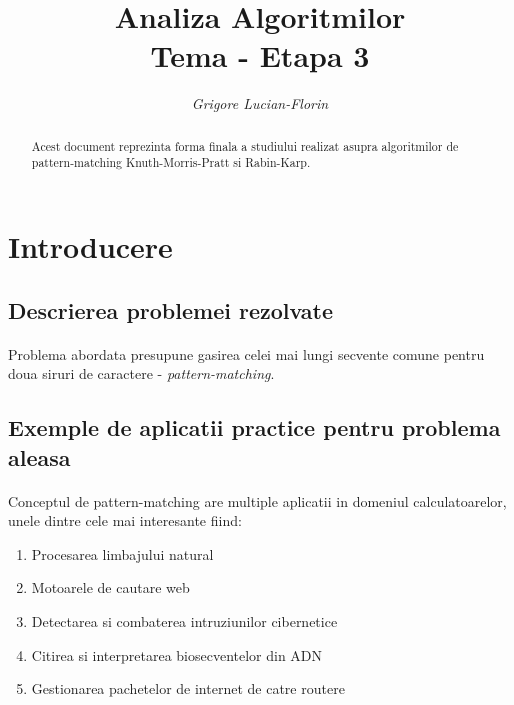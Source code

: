 \documentclass[runningheads]{llncs}
\begin{document}
\title{\huge{Analiza Algoritmilor\\Tema - Etapa 3}}
\author{\textit{\large{Grigore Lucian-Florin}}}
\maketitle              
\begin{abstract}
Acest document reprezinta forma finala a studiului realizat asupra algoritmilor de pattern-matching Knuth-Morris-Pratt si Rabin-Karp.

\end{abstract}

\section{Introducere}
\subsection{Descrierea problemei rezolvate}
\paragraph{} Problema abordata presupune gasirea celei mai lungi secvente comune pentru doua siruri de caractere - \textit{pattern-matching}.

\subsection{Exemple de aplicatii practice pentru problema aleasa} 
\paragraph{} Conceptul de pattern-matching are multiple aplicatii in domeniul calculatoarelor, unele dintre cele mai interesante fiind:
\begin{enumerate}
\item Procesarea limbajului natural
\item Motoarele de cautare web
\item Detectarea si combaterea intruziunilor cibernetice
\item Citirea si interpretarea biosecventelor din ADN
\item Gestionarea pachetelor de internet de catre routere
\end{enumerate}
\end{document}
